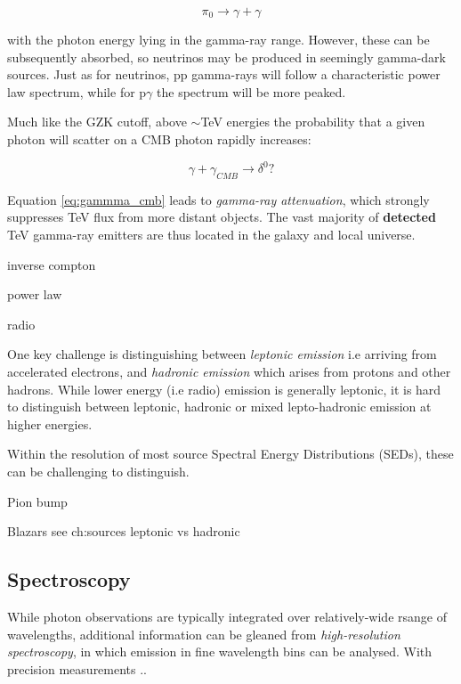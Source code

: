 \begin{equation}
	\pi_{0} \rightarrow \gamma + \gamma
\end{equation}

with the photon energy lying in the gamma-ray range. However, these can be subsequently absorbed, so neutrinos may be produced in seemingly gamma-dark sources. Just as for neutrinos, pp gamma-rays will follow a characteristic power law spectrum, while for p$\gamma$ the spectrum will be more peaked.

Much like the GZK cutoff, above $\sim$TeV energies the probability that a given photon will scatter on a CMB photon rapidly increases: 

\begin{equation}
	\gamma + \gamma_{CMB} \rightarrow \delta^{0}?
	\label{eq:gamma_cmb}
\end{equation}

Equation \ref{eq:gammma_cmb} leads to \emph{gamma-ray attenuation}, which strongly suppresses TeV flux from more distant objects. The vast majority of \textbf{detected} TeV gamma-ray emitters are thus located in the galaxy and local universe.

inverse compton
 
 power law
 
 radio
 
 One key challenge is distinguishing between \emph{leptonic emission} i.e arriving from accelerated electrons, and \emph{hadronic emission} which arises from protons and other hadrons. While lower energy (i.e radio) emission is generally leptonic, it is hard to distinguish between leptonic, hadronic or mixed lepto-hadronic emission at higher energies.
 
 Within the resolution of most source Spectral Energy Distributions (SEDs), these can be challenging to distinguish. 
 
 Pion bump
 
 Blazars see ch:sources leptonic vs hadronic
 
 \subsection*{Spectroscopy}
 
While photon observations are typically integrated over relatively-wide rsange of wavelengths, additional information can be gleaned from \emph{high-resolution spectroscopy}, in which emission in fine wavelength bins can be analysed. With precision measurements  ..

